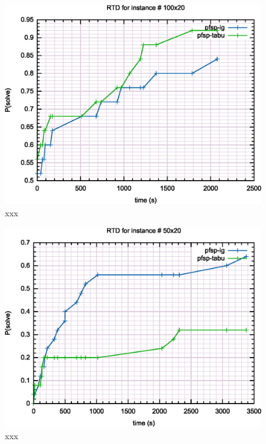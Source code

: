 

\begin{figure}[H]
	\centering
	\includegraphics[width=\textwidth]{fig/qrd/100x20}
	\caption{xxx}
\end{figure}

\begin{figure}[H]
	\centering
	\includegraphics[width=\textwidth]{fig/qrd/50x20}
	\caption{xxx}
\end{figure}

